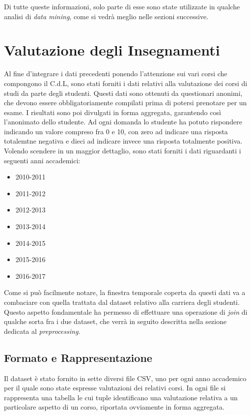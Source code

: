 Di tutte queste informazioni, solo parte di esse sono state utilizzate in qualche analisi di \textit{data mining}, come si vedrà meglio nelle sezioni successive.

\section{Valutazione degli Insegnamenti}

Al fine d'integrare i dati precedenti ponendo l'attenzione sui vari corsi che compongono il C.d.L, sono stati forniti i dati relativi alla valutazione dei corsi di studi da parte degli studenti. Questi dati sono ottenuti da questionari anonimi, che devono essere obbligatoriamente compilati prima di potersi prenotare per un esame. I risultati sono poi divulgati in forma aggregata, garantendo così l'anonimato dello studente. Ad ogni domanda lo studente ha potuto rispondere indicando un valore compreso fra 0 e 10, con zero ad indicare una risposta totalemtne negativa e dieci ad indicare invece una risposta totalmente positiva.\\

Volendo scendere in un maggior dettaglio, sono stati forniti i dati riguardanti i seguenti anni accademici:

\begin{itemize}
	\item 2010-2011
	\item 2011-2012
	\item 2012-2013
	\item 2013-2014
	\item 2014-2015
	\item 2015-2016
	\item 2016-2017
\end{itemize}

Come si può facilmente notare, la finestra temporale coperta da questi dati va a combaciare con quella trattata dal dataset relativo alla carriera degli studenti. Questo aspetto fondamentale ha permesso di effettuare una operazione di \textit{join} di qualche sorta fra i due dataset, che verrà in seguito descritta nella sezione dedicata al \textit{preprocessing}.

\subsection{Formato e Rappresentazione}

Il dataset è stato fornito in sette diversi file CSV, uno per ogni anno accademico per il quale sono state espresse valutazioni dei relativi corsi. In ogni file si rappresenta una tabella le cui tuple identificano una valutazione relativa a un particolare aspetto di un corso, riportata ovviamente in forma aggregata.

